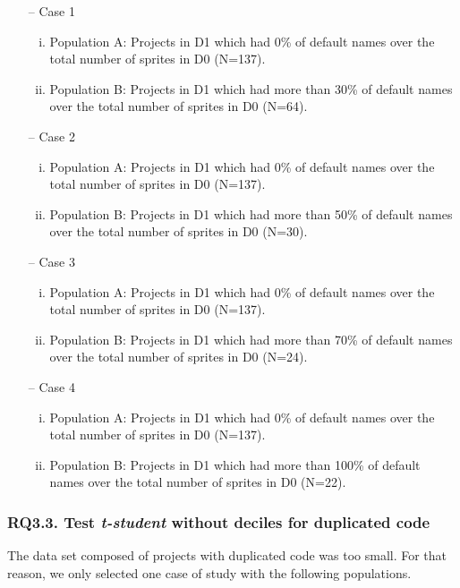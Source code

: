 \begin{itemize}
    \item[--] Case 1
    \begin{enumerate}[(i)]
        \item Population A: Projects in D1 which had 0\% of default names over the total number of sprites in D0 (N=137).
        \item Population B: Projects in D1 which had more than 30\% of default names over the total number of sprites  in D0 (N=64).
    \end{enumerate}
    \item[--] Case 2
    \begin{enumerate}[(i)]
        \item Population A: Projects in D1 which had 0\% of default names over the total number of sprites in D0 (N=137).
        \item Population B: Projects in D1 which had more than 50\% of default names over the total number of sprites  in D0 (N=30).
    \end{enumerate}
    \item[--] Case 3
    \begin{enumerate}[(i)]
        \item Population A: Projects in D1 which had 0\% of default names over the total number of sprites in D0 (N=137).
        \item Population B: Projects in D1 which had more than 70\% of default names over the total number of sprites  in D0 (N=24).
    \end{enumerate}
    \item[--] Case 4
    \begin{enumerate}[(i)]
        \item Population A: Projects in D1 which had 0\% of default names over the total number of sprites in D0 (N=137).
        \item Population B: Projects in D1 which had more than 100\% of default names over the total number of sprites in D0 (N=22).
    \end{enumerate}
\end{itemize}


\subsubsection{RQ3.3. Test \textit{t-student} without deciles for duplicated code}
\label{subsubsec:RQ3_3_statistical}

The data set composed of projects with duplicated code was too small. For that reason, we only selected one case of study with the following populations. 

